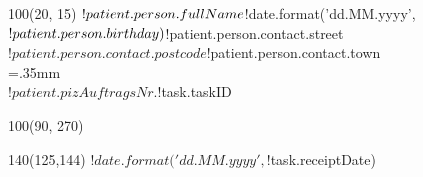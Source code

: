 \documentclass{scrartcl}
\begin{document}
 
 
\baselineskip10pt

\textblockorigin{0in}{0in}
\setlength{\TPHorizModule}{1mm}
\setlength{\TPVertModule}{1mm}

{
\scriptsize
\begin{textblock}{100}(20, 15) 
\noindent $!patient.person.fullName\\
$!date.format('dd.MM.yyyy', $!patient.person.birthday)\\
$!patient.person.contact.street \\
$!patient.person.contact.postcode $!patient.person.contact.town\\
\X=.35mm        
\barheight=1cm 
\\
$!patient.piz  Auftrags Nr. $!task.taskID\\
\end{textblock}
}

{
\begin{textblock}{100}(90, 270) 
%
\end{textblock}
}

{
\huge
{}
}

{
\large
\begin{textblock}{140}(125,144) 
\noindent 
$!date.format('dd.MM.yyyy', $!task.receiptDate)
\end{textblock}
}
\end{document}
